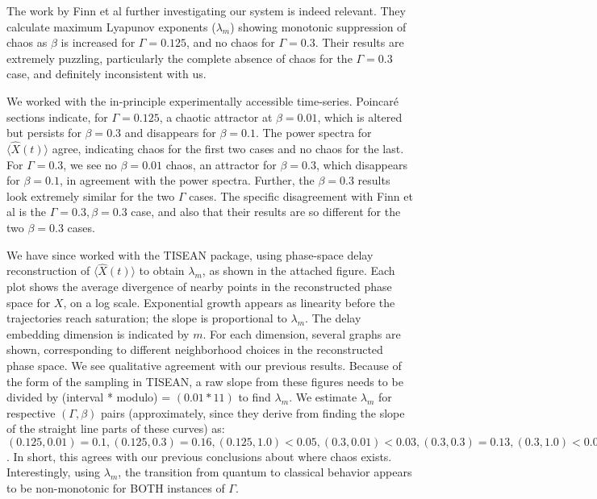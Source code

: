 \documentclass[prl,aps,twocolumn,showpacs,floatfix]{revtex4}
\begin{document}

The work by Finn et al further investigating our system is indeed relevant. 
They calculate maximum Lyapunov exponents ($\lambda_m$) showing 
monotonic suppression of chaos as $\beta$ is increased for $\Gamma = 0.125$, 
and no chaos for $\Gamma=0.3$.  Their results are extremely puzzling, 
particularly the complete absence of chaos for the $\Gamma = 0.3$ case, 
and definitely inconsistent with us. 

We worked with the in-principle experimentally accessible time-series. 
Poincar\'e sections indicate, for $\Gamma = 0.125$, a chaotic attractor 
at $\beta = 0.01$, which is altered but persists for $\beta = 0.3$ 
and disappears for $\beta = 0.1$. The power spectra for 
$\langle \hat X(t) \rangle$ agree, indicating chaos for the first two cases 
and no chaos for the last. For $\Gamma = 0.3$, we see no $\beta = 0.01$ 
chaos, an attractor for $\beta = 0.3$, which disappears for $\beta = 0.1$, 
in agreement with the power spectra. Further, the $\beta = 0.3$ results
look extremely similar for the two $\Gamma$ cases. The specific disagreement 
with Finn et al is the $\Gamma=0.3,\beta=0.3$ case, and also that their 
results are so different for the two $\beta = 0.3$ cases. 

We have since worked with the TISEAN package, using phase-space delay 
reconstruction of $\langle \hat X(t) \rangle$ to obtain $\lambda_m$, as 
shown in the attached figure. Each plot shows the average divergence of 
nearby points in the reconstructed phase space for $X$, on a log scale. 
Exponential growth appears as linearity before the trajectories reach 
saturation; the slope is proportional to $\lambda_m$. The delay embedding 
dimension is indicated by $m$. For each dimension, several graphs are 
shown, corresponding to different neighborhood 
choices in the reconstructed phase space. We see qualitative agreement 
with our previous results. Because of the form of the sampling in TISEAN, 
a raw slope from these figures needs to be divided by (interval * modulo) = 
$(0.01 * 11)$ to find $\lambda_m$. We estimate $\lambda_m$ for respective 
$(\Gamma, \beta)$ pairs (approximately, since they derive
from finding the slope of the straight line parts of these curves) as:
$(0.125,0.01) = 0.1, (0.125,0.3) = 0.16, (0.125,1.0) < 0.05,
(0.3,0.01) < 0.03, (0.3,0.3) = 0.13, (0.3,1.0) < 0.05$. In short,
this agrees with our previous conclusions about where chaos exists. 
Interestingly, using $\lambda_m$, the transition from quantum to
classical behavior appears to be non-monotonic for BOTH instances of
$\Gamma$.
\end{document}
